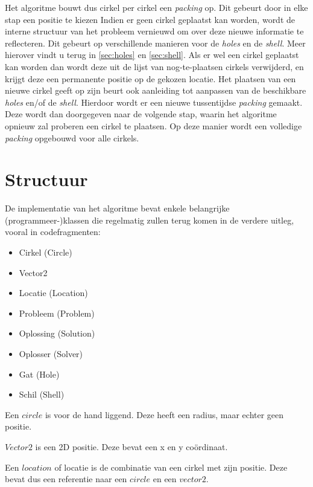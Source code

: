 \documentclass[12pt,a4paper,oneside]{book}
\begin{document}
{Het algoritme bouwt dus cirkel per cirkel een \textit{packing} op.
Dit gebeurt door in elke stap een positie te kiezen %
Indien er geen cirkel geplaatst kan worden, wordt de interne structuur van het probleem vernieuwd om over deze nieuwe informatie te reflecteren.
Dit gebeurt op verschillende manieren voor de \textit{holes} en de \textit{shell}.
Meer hierover vindt u terug in \autoref{sec:holes} en \autoref{sec:shell}.
Als er wel een cirkel geplaatst kan worden dan wordt deze uit de lijst van nog-te-plaatsen cirkels verwijderd, en krijgt deze een permanente positie op de gekozen locatie.
Het plaatsen van een nieuwe cirkel geeft op zijn beurt ook aanleiding tot aanpassen van de beschikbare \textit{holes} en/of de \textit{shell}.
Hierdoor wordt er een nieuwe tussentijdse \textit{packing} gemaakt.
Deze wordt dan doorgegeven naar de volgende stap, waarin het algoritme opnieuw zal proberen een cirkel te plaatsen.
Op deze manier wordt een volledige \textit{packing} opgebouwd voor alle cirkels.

\section{Structuur}

De implementatie van het algoritme bevat enkele belangrijke (programmeer-)klassen die regelmatig zullen terug komen in de verdere uitleg, vooral in codefragmenten:

\begin{itemize} 
\item Cirkel (Circle)
\item Vector2
\item Locatie (Location)
\item Probleem (Problem)
\item Oplossing (Solution)
\item Oplosser (Solver)
\item Gat (Hole)
\item Schil (Shell)
\end{itemize}

Een $circle$ is voor de hand liggend. Deze heeft een radius, maar echter geen positie.

$Vector2$ is een 2D positie. Deze bevat een x en y coördinaat.

Een $location$ of locatie is de combinatie van een cirkel met zijn positie. Deze bevat dus een referentie naar een $circle$ en een $vector2$.

}
\end{document}
